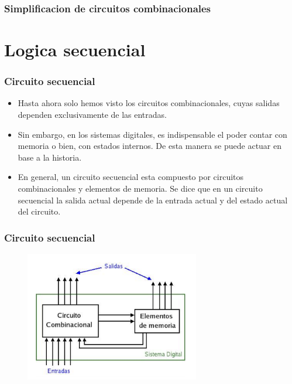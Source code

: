 \documentclass{beamer}
\newcommand{\implicant}[3][0]{
    \draw[rounded corners=3pt] ($(#2.north west)+(135:#1)$) rectangle ($(#3.south east)+(-45:#1)$);
    }
\newcommand{\implicantcostats}[3][0]{
    \draw[rounded corners=3pt] ($(rf.east |- #2.north)+(90:#1)$)-| ($(#2.east)+(0:#1)$) |- ($(rf.east |- #3.south)+(-90:#1)$);
    \draw[rounded corners=3pt] ($(cf.west |- #2.north)+(90:#1)$) -| ($(#3.west)+(180:#1)$) |- ($(cf.west |- #3.south)+(-90:#1)$);
}
\def\ol#1{\overline{#1}}
\newenvironment{Karnaughvuit}%
{
\begin{tikzpicture}[baseline=(current bounding box.north),scale=0.8]
\draw (0,0) grid (4,2);
%
\matrix (mapa) [matrix of nodes,
        column sep={0.8cm,between origins},
        row sep={0.8cm,between origins},
        every node/.style={minimum size=0.3mm},
        anchor=4.center,
        ampersand replacement=\&] at (0.5,0.5)
{
                      \& |(c00)| $\ol{BA}$  \& |(c01)| $\ol{B}A$  \& |(c11)| $BA$       \& |(c10)| $B\ol{A}$  \& |(cf)| \phantom{00} \\
|(r00)| $\ol{C}$      \& |(0)|  \phantom{0} \& |(1)|  \phantom{0} \& |(3)|  \phantom{0} \& |(2)|  \phantom{0} \&                     \\
|(r01)| $C$           \& |(4)|  \phantom{0} \& |(5)|  \phantom{0} \& |(7)|  \phantom{0} \& |(6)|  \phantom{0} \&                     \\
|(rf) | \phantom{00}  \&                    \&                    \&                    \&                    \&                     \\
};
}%
{
\end{tikzpicture}
}
\newcommand{\minterms}[1]{%
    \foreach \x in {#1}
        \path (\x) node {1};
}
\newcommand{\maxterms}[1]{%
    \foreach \x in {#1}
        \path (\x) node {0};
}
\newcommand{\indeterminats}[1]{%
    \foreach \x in {#1}
        \path (\x) node {X};
}
\begin{document}
\begin{frame}
\frametitle{Simplificacion de circuitos combinacionales}
\end{frame}

\section{Logica secuencial}

\begin{frame}
\frametitle{Circuito secuencial}
\begin{itemize}
\item Hasta ahora solo hemos visto los circuitos combinacionales, cuyas salidas dependen exclusivamente de las entradas.
\item Sin embargo, en los sistemas digitales, es indispensable el poder contar con memoria o bien, con estados internos. De esta manera se puede actuar en base a la historia.
\item En general, un circuito secuencial esta compuesto por circuitos combinacionales y elementos de memoria. Se dice que en un circuito secuencial la salida actual depende de la entrada actual y del estado actual del circuito.
\end{itemize}
\end{frame}

\begin{frame}
\frametitle{Circuito secuencial}
\begin{figure}[!h]
\centering
\includegraphics[width=3in]{secuencial}
\end{figure}
\end{frame}
\end{document}
